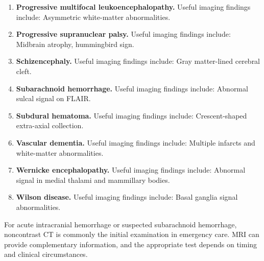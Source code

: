 \begin{enumerate}[leftmargin=*,itemsep=0.45em,topsep=0.4em]
\item \textbf{Progressive multifocal leukoencephalopathy.} Useful imaging findings include: Asymmetric white-matter abnormalities.
\item \textbf{Progressive supranuclear palsy.} Useful imaging findings include: Midbrain atrophy, hummingbird sign.
\item \textbf{Schizencephaly.} Useful imaging findings include: Gray matter-lined cerebral cleft.
\item \textbf{Subarachnoid hemorrhage.} Useful imaging findings include: Abnormal sulcal signal on FLAIR.
\item \textbf{Subdural hematoma.} Useful imaging findings include: Crescent-shaped extra-axial collection.
\item \textbf{Vascular dementia.} Useful imaging findings include: Multiple infarcts and white-matter abnormalities.
\item \textbf{Wernicke encephalopathy.} Useful imaging findings include: Abnormal signal in medial thalami and mammillary bodies.
\item \textbf{Wilson disease.} Useful imaging findings include: Basal ganglia signal abnormalities.
\end{enumerate}

For acute intracranial hemorrhage or suspected subarachnoid hemorrhage, noncontrast CT is commonly the initial examination in emergency care. MRI can provide complementary information, and the appropriate test depends on timing and clinical circumstances.

